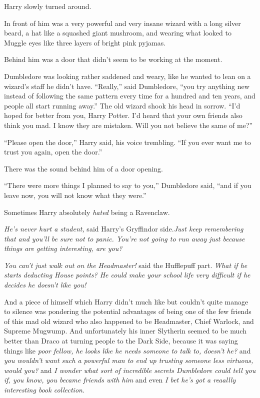 Harry slowly turned around.

In front of him was a very powerful and very insane wizard with a long
silver beard, a hat like a squashed giant mushroom, and wearing what
looked to Muggle eyes like three layers of bright pink pyjamas.

Behind him was a door that didn't seem to be working at the moment.

Dumbledore was looking rather saddened and weary, like he wanted to lean
on a wizard's staff he didn't have. ``Really,'' said Dumbledore, ``you
try anything new instead of following the same pattern every time for a
hundred and ten years, and people all start running away.'' The old
wizard shook his head in sorrow. ``I'd hoped for better from you, Harry
Potter. I'd heard that your own friends also think you mad. I know they
are mistaken. Will you not believe the same of me?''

``Please open the door,'' Harry said, his voice trembling. ``If you ever
want me to trust you again, open the door.''

There was the sound behind him of a door opening.

``There were more things I planned to say to you,'' Dumbledore said,
``and if you leave now, you will not know what they were.''

Sometimes Harry absolutely \emph{hated} being a Ravenclaw.

\emph{He's never hurt a student,} said Harry's Gryffindor
side.\emph{Just keep remembering that and you'll be sure not to panic.
You're not going to run away just because things are getting
interesting, are you?}

\emph{You can't just walk out on the Headmaster!} said the Hufflepuff
part. \emph{What if he starts deducting House points? He could make your
school life very difficult if he decides he doesn't like you!}

And a piece of himself which Harry didn't much like but couldn't quite
manage to silence was pondering the potential advantages of being one of
the few friends of this mad old wizard who also happened to be
Headmaster, Chief Warlock, and Supreme Mugwump. And unfortunately his
inner Slytherin seemed to be much better than Draco at turning people to
the Dark Side, because it was saying things like \emph{poor fellow, he
looks like he needs someone to talk to, doesn't he?} and \emph{you
wouldn't want such a powerful man to end up trusting someone less
virtuous, would you?} and \emph{I wonder what sort of incredible secrets
Dumbledore could tell you if, you know, you became friends with him} and
even \emph{I bet he's got a reaallly interesting book collection.}

